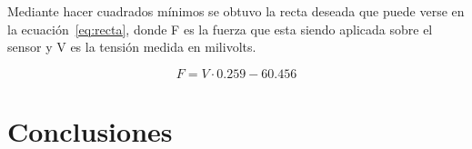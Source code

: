 \documentclass[a4paper, 10pt, spanish]{article}
\begin{document}
     Mediante hacer cuadrados mínimos se obtuvo la recta deseada que puede verse en la ecuación~\ref{eq:recta}, donde F es la fuerza que esta siendo aplicada sobre el sensor y V es la tensión medida en milivolts.
     
    \begin{equation}\label{eq:recta}
        F = V\cdot0.259 - 60.456
    \end{equation}
     
     
\section{Conclusiones}
\end{document}
